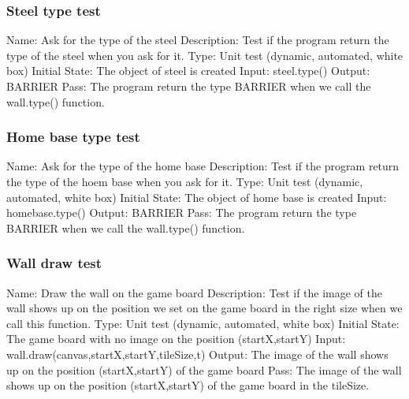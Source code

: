 \documentclass{article}
\begin{document}
\subsubsection{Steel type test}
Name:  Ask for the type of the steel\newline
Description: Test if the program return the type of the steel when you ask for it. \newline
Type: Unit test (dynamic, automated, white box) \newline
Initial State:  The object of steel is created \newline
Input: steel.type()\newline
Output: BARRIER\newline
Pass:  The program return the type BARRIER when we call the wall.type() function. \newline

\subsubsection{Home base type test}
Name:  Ask for the type of the home base\newline
Description: Test if the program return the type of the hoem base when you ask for it. \newline
Type: Unit test (dynamic, automated, white box) \newline
Initial State:  The object of home base is created \newline
Input: homebase.type()\newline
Output: BARRIER\newline
Pass:  The program return the type BARRIER when we call the wall.type() function. \newline

\subsubsection{Wall draw test}
Name:  Draw the wall on the game board\newline
Description: Test if the image of the wall shows up on the position we set on the game board in the right size when we call this function. \newline
Type: Unit test (dynamic, automated, white box) \newline
Initial State:  The game board with no image on the position (startX,startY) \newline
Input: wall.draw(canvas,startX,startY,tileSize,t)\newline
Output: The image of the wall shows up on the position (startX,startY) of the game board\newline
Pass:  The image of the wall shows up on the position (startX,startY) of the game board in the tileSize. \newline
\end{document}

